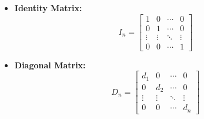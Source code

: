\documentclass{article}
\begin{document}
\begin{itemize}
    \item \textbf{Identity Matrix:}
    \begin{equation}
        I_n =
        \left[
            \begin{array}{cccc}
                1 & 0 & \cdots & 0 \\
                0 & 1 & \cdots & 0 \\
                \vdots & \vdots & \ddots & \vdots \\
                0 & 0 & \cdots & 1
            \end{array}
        \right]
        \label{eq:iden}
    \end{equation}

    \item \textbf{Diagonal Matrix:}
    \begin{equation}
        D_n =
        \left[
            \begin{array}{cccc}
                d_1 & 0 & \cdots & 0 \\
                0 & d_2 & \cdots & 0 \\
                \vdots & \vdots & \ddots & \vdots \\
                0 & 0 & \cdots & d_n
            \end{array}
        \right]
        \label{eq:diagm}
    \end{equation}

\end{itemize}
\end{document}
